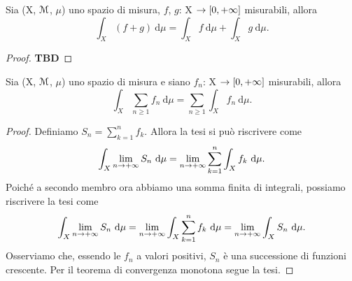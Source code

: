 \documentclass[Completo.tex]{subfiles}
\begin{document}
\begin{Prop}
	Sia (X, $\eu[M]$, $\mu$) uno spazio di misura, $f$, $g$: X $\rightarrow [0, +\infty]$ misurabili, allora
	\begin{equation*}
	\int_X (f+g) \ \mathrm{d}\mu = \int_X f \ \mathrm{d}\mu + \int_X g \ \mathrm{d}\mu.
	\end{equation*}
\end{Prop}
\begin{proof}
	\textbf{TBD}
\end{proof}
\begin{eTh}
	Sia (X, $\eu[M]$, $\mu$) uno spazio di misura e siano $f_n$: X $\rightarrow [0, +\infty]$ misurabili, allora
	\begin{equation*}
	\int_X \sum_{n\geq 1} f_n \ \mathrm{d}\mu = \sum_{n\geq 1} \int_X f_n \ \mathrm{d}\mu.
	\end{equation*}
\end{eTh}
\begin{proof}
	Definiamo $S_n = \sum_{k=1}^{n} f_k$. Allora la tesi si può riscrivere come
	\begin{equation*}
	\int_X \lim_{n \rightarrow +\infty} S_n \ \mathrm{d}\mu = \lim_{n \rightarrow +\infty} \sum_{k=1}^{n} \int_X f_k \ \mathrm{d}\mu.
	\end{equation*}
	Poiché a secondo membro ora abbiamo una somma finita di integrali, possiamo riscrivere la tesi come
	\begin{equation*}
	\int_X \lim_{n \ra +\infty} S_n \ \mathrm{d}\mu = \lim_{n \ra +\infty} \int_X \sum_{k = 1}^{n} f_k \ \mathrm{d}\mu = \lim_{n \ra +\infty} \int_X S_n \ \mathrm{d}\mu.
	\end{equation*}
	Osserviamo che, essendo le $f_n$ a valori positivi, $S_n$ è una successione di funzioni crescente. Per il teorema di convergenza monotona segue la tesi.
\end{proof}
\end{document}
